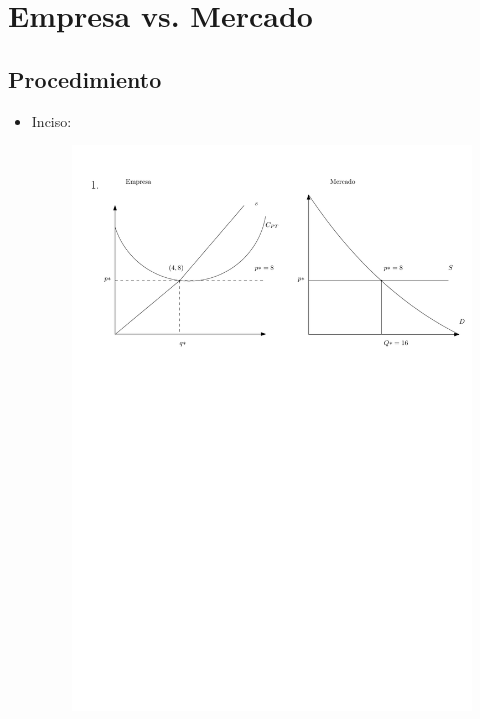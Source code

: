 \section{Empresa vs. Mercado}
\begin{figure}
    \centering
\end{figure}

\subsection{Procedimiento}
\begin{itemize}
    \item Inciso:
        \begin{center}
            \begin{figure}[!htb]
                \centering
                \includegraphics[width=18cm]{./Clases/figs/01}

\end{figure}
\end{center}
\end{itemize}
